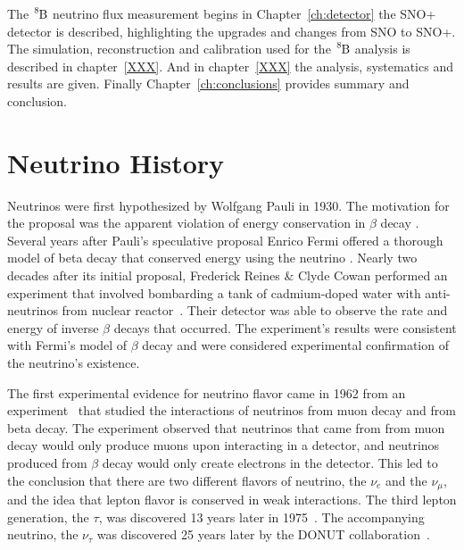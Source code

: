 The $\ce{^{8}B}$ neutrino flux measurement begins in Chapter~\ref{ch:detector}
the SNO+ detector is described, highlighting the upgrades and changes from SNO
to SNO+.
The simulation, reconstruction and calibration used for the 
$\ce{^{8}B}$ analysis is described in chapter~\ref{XXX}.
And in chapter~\ref{XXX} the analysis, systematics and results are
given.
Finally Chapter~\ref{ch:conclusions} provides summary and conclusion.

%
%
\section{Neutrino History}
Neutrinos were first hypothesized by Wolfgang Pauli in 1930.
The motivation for the proposal was the apparent violation of energy
conservation in $\beta$ decay \citep{pauli_letter}.
Several years after Pauli's speculative proposal Enrico Fermi offered
a thorough model of beta decay that conserved energy using the neutrino
\citep{fermi_beta_decay}.
Nearly two decades after its initial proposal, Frederick Reines \&
Clyde Cowan performed an experiment that involved bombarding a tank of
cadmium-doped water with anti-neutrinos from nuclear
reactor~\citep{cowan_reines}.
Their detector was able to observe the rate and energy of inverse $\beta$
decays that occurred.
The experiment's results were consistent with Fermi's model of $\beta$ decay and were
considered experimental confirmation of the neutrino's existence.

The first experimental evidence for neutrino flavor came in 1962 from an
experiment~\citep{lederman_muon_flavor} that studied the interactions of
neutrinos from muon decay and 
from beta decay.
The experiment observed that neutrinos that came from from muon decay would only produce
muons upon interacting in a detector,
and neutrinos produced from $\beta$ decay would only create electrons in the
detector.
This led to the conclusion that there are two different flavors of neutrino,
the $\nu_e$ and the $\nu_{\mu}$, and the idea that lepton flavor is conserved in
weak interactions.
The third lepton generation, the $\tau$, was discovered 13
years later in 1975~\citep{tau_discovery}. The accompanying neutrino, the $\nu_\tau$
was discovered 25 years later by the DONUT collaboration~\cite{donut}.

